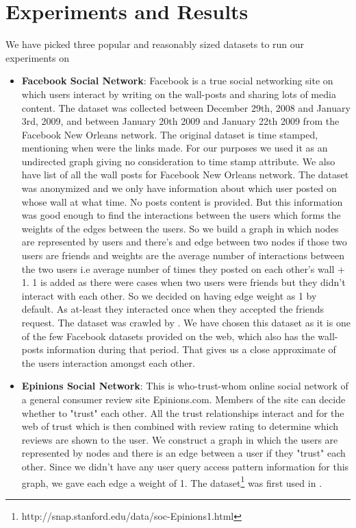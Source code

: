 \documentclass[letterpaper]{article}
\begin{document}
\section{Experiments and Results}
We have picked three popular and reasonably sized datasets to run our experiments on
\begin{itemize}
\item \textbf{Facebook Social Network}: Facebook is a true social networking
site on which users interact by writing on the wall-posts and sharing lots of
media content. The dataset was collected between December 29th, 2008 and
January 3rd, 2009, and between January 20th 2009 and January 22th 2009 from the
Facebook New Orleans network. The original dataset is time stamped, mentioning
when were the links made.  For our purposes we used it as an undirected graph
giving no consideration to time stamp attribute.  We also have list of all the
wall posts for Facebook New Orleans network. The dataset was anonymized and we
only have information about which user posted on whose wall at what time. No
posts content is provided. But this information was good enough to find the
interactions between the users which forms the weights of the edges between the
users.  So we build a graph in which nodes are represented by users and there's
and edge between two nodes if those two users are friends and weights are the
average number of interactions between the two users i.e average number of
times they posted on each other's wall + 1. 1 is added as there were cases when
two users were friends but they didn't interact with each other. So we decided
on having edge weight as 1 by default. As at-least they interacted once when
they accepted the friends request. The dataset was crawled by \cite{26}. We have chosen
this dataset as it is one of the few Facebook datasets provided on the web, which also has
the wall-posts information during that period. That gives us a close approximate of
the users interaction amongst each other.

\item \textbf{Epinions Social Network}: This is who-trust-whom online social
network of a general consumer review site Epinions.com. Members of the site can
decide whether to "trust" each other.  All the trust relationships interact and
for the web of trust which is then combined with review rating to determine
which reviews are shown to the user. We construct a graph in which the users
are represented by nodes and there is an edge between a user if they "trust"
each other. Since we didn't have any user query access pattern information for
this graph, we gave each edge a weight of 1. The
dataset\footnote{http://snap.stanford.edu/data/soc-Epinions1.html} was first
used in \cite{epi2003}.


\end{itemize}
\end{document}
